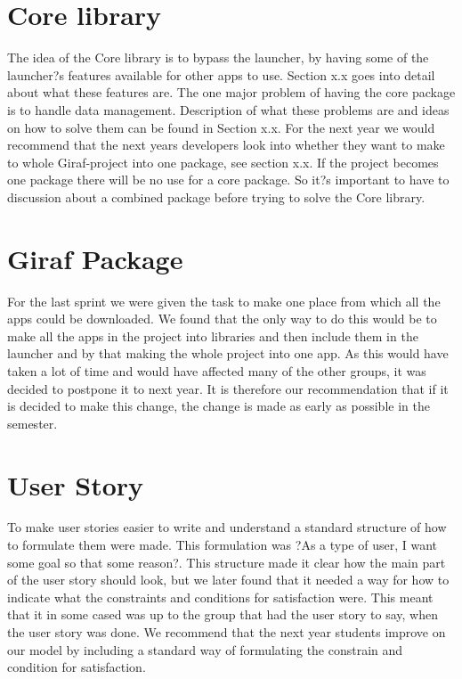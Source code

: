 \section{Core library}
The idea of the Core library is to bypass the launcher, by having some of the launcher?s features available for other apps to use. Section x.x goes into detail about what these features are. The one major problem of having the core package is to handle data management. Description of what these problems are and ideas on how to solve them can be found in Section x.x.
For the next year we would recommend that the next years developers look into whether they want to make to whole Giraf-project into one package, see section x.x. If the project becomes one package there will be no use for a core package. So it?s important to have to discussion about a combined package before trying to solve the Core library.  

\section{Giraf Package}
For the last sprint we were given the task to make one place from which all the apps could be downloaded. We found that the only way to do this would be to make all the apps in the project into libraries and then include them in the launcher and by that making the whole project into one app. As this would have taken a lot of time and would have affected many of the other groups, it was decided to postpone it to next year. It is therefore our recommendation that if it is decided to make this change, the change is made as early as possible in the semester.

\section{User Story}
To make user stories easier to write and understand a standard structure of how to formulate them were made. This formulation was ?As a {type of user}, I want {some goal} so that {some reason}?. This structure made it clear how the main part of the user story should look, but we later found that it needed a way for how to indicate what the constraints and conditions for satisfaction were. This meant that it in some cased was up to the group that had the user story to say, when the user story was done. We recommend that the next year students improve on our model by including a standard way of formulating the constrain and condition for satisfaction.

